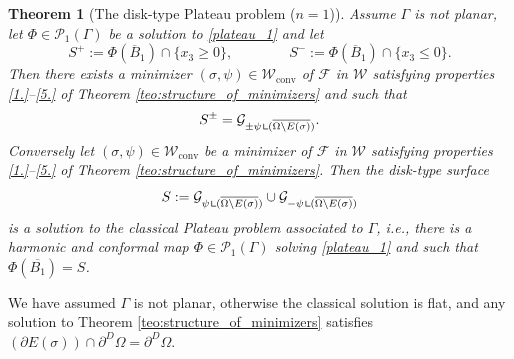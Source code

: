 \documentclass[11pt]{article}
\newcommand{\ie}{i.e.,\xspace}
\numberwithin{equation}{section}
\let\Om\Omega
\newcommand\admclassconv{{\mathcal W_\mathrm{conv}}}
\newcommand{\resa}{\mathop{\hbox{\vrule height 7pt width 0.5pt depth 0pt
\vrule height 0.5pt width 6pt depth 0pt}}\nolimits}
\newcommand{\resb}{\mathop{\hbox{\vrule height 4pt width 0.5pt depth 0pt
\vrule height 0.5pt width 3pt depth 0pt}}\nolimits}
\newcommand{\res}{\mathchoice{\resa}{\resa}{\resb}{\resb}}
\newtheorem{theorem}{Theorem}[section]
\theoremstyle{definition}
\begin{document}
\begin{theorem}[The disk-type Plateau problem ($n=1$)]
\label{teo:the_disk_type_Plateau_problem_n=1}
Assume $\Gamma$ is not planar, let $\Phi\in\mathcal{P}_1(\Gamma)$ be a solution to \eqref{plateau_1} and let
\[
S^+:=\Phi(\overline B_1)\cap \{x_3\ge0\},
\qquad \qquad S^-:=\Phi(\overline B_1)\cap \{x_3\le0\}.
\]
Then there exists a minimizer $(\sigma,\psi)\in \admclassconv$ of $\mathcal F$ in
$\mathcal W$
satisfying properties \ref{1.}--\ref{5.} of Theorem \ref{teo:structure_of_minimizers} and such that
\begin{equation}\label{eq:graph}
S^{\pm}=\mathcal G_{\pm\psi\res (\overline{\Om\setminus E(\sigma)})}.
\end{equation}
Conversely let $(\sigma,\psi)\in \admclassconv$ be a minimizer of $\mathcal F$ in $\mathcal W$ satisfying properties \ref{1.}--\ref{5.} of Theorem \ref{teo:structure_of_minimizers}. Then the disk-type surface
\[
S:=\mathcal G_{\psi\res (\overline{\Om\setminus E(\sigma)})}\cup\mathcal G_{-\psi\res (\overline{\Om\setminus E(\sigma)})}
\]
is a solution to the classical Plateau problem associated to $\Gamma$, \ie there is a harmonic and conformal map $\Phi\in\mathcal{P}_1(\Gamma)$
solving \eqref{plateau_1} and such that $\Phi(\overline{B_1})=S$.
\end{theorem}
{ We have assumed $\Gamma$ is not planar, otherwise the classical solution is flat, and any solution to Theorem \ref{teo:structure_of_minimizers} satisfies $(\partial E(\sigma))\cap \partial^D\Om=\partial^D\Om$.}
\end{document}
